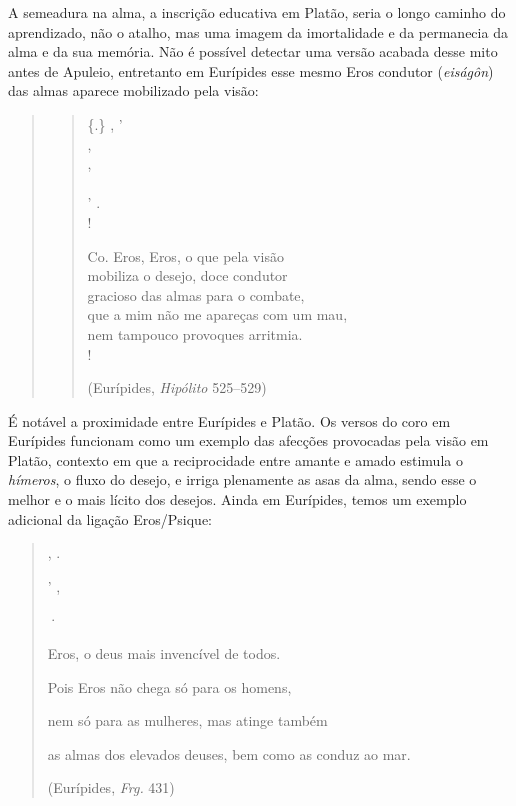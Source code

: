 A semeadura na alma, a inscrição educativa em Platão, seria o longo
caminho do aprendizado, não o atalho, mas uma imagem da imortalidade e
da permanecia da alma e da sua memória. Não é possível detectar uma
versão acabada desse mito antes de Apuleio, entretanto em Eurípides esse
mesmo Eros condutor (\emph{eiságôn}) das almas aparece mobilizado pela
visão:

 

\begin{quote}

\begin{verse}
\{.\}  ,  ' \\
 ,  \\
   ,\\
     \\
'  .\\!


{Co.} Eros, Eros, o que pela visão\\
mobiliza o desejo, doce condutor\\
gracioso das almas para o combate,\\
que a mim não me apareças com um mau,\\
nem tampouco provoques arritmia.\\!

\hfill (Eurípides, \emph{Hipólito} 525--529)
\end{verse}
\end{quote}

 

É notável a proximidade entre Eurípides e Platão. Os versos do coro em
Eurípides funcionam como um exemplo das afecções provocadas pela visão
em Platão, contexto em que a reciprocidade entre amante e amado estimula
o \emph{hímeros}, o fluxo do desejo, e irriga plenamente as asas da
alma, sendo esse o melhor e o mais lícito dos desejos. Ainda em
Eurípides, temos um exemplo adicional da ligação Eros/\allowbreak{}Psique:

 

\begin{quote}
,   .

     

'  ,    

    ·

 

Eros, o deus mais invencível de todos.

Pois Eros não chega só para os homens,

nem só para as mulheres, mas atinge também

as almas dos elevados deuses, bem como as conduz ao mar.

 

(Eurípides, \emph{Frg. }431)
\end{quote}

